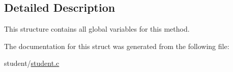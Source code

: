 \subsection{Detailed Description}
This structure contains all global variables for this method. 

The documentation for this struct was generated from the following file\-:\begin{DoxyCompactItemize}
\item 
student/\hyperlink{student_8c}{student.\-c}\end{DoxyCompactItemize}
